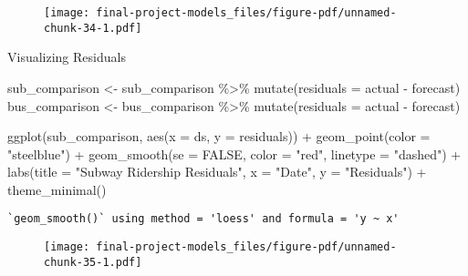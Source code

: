 \documentclass[
  letterpaper,
  DIV=11,
  numbers=noendperiod]{scrartcl}
\newenvironment{Shaded}{\begin{snugshade}}{\end{snugshade}}
\newcommand{\AttributeTok}[1]{\textcolor[rgb]{0.40,0.45,0.13}{#1}}
\newcommand{\ConstantTok}[1]{\textcolor[rgb]{0.56,0.35,0.01}{#1}}
\newcommand{\FunctionTok}[1]{\textcolor[rgb]{0.28,0.35,0.67}{#1}}
\newcommand{\NormalTok}[1]{\textcolor[rgb]{0.00,0.23,0.31}{#1}}
\newcommand{\OtherTok}[1]{\textcolor[rgb]{0.00,0.23,0.31}{#1}}
\newcommand{\SpecialCharTok}[1]{\textcolor[rgb]{0.37,0.37,0.37}{#1}}
\newcommand{\StringTok}[1]{\textcolor[rgb]{0.13,0.47,0.30}{#1}}
\begin{document}
\begin{figure}[H]

{\centering \texttt{[image: final-project-models\_files/figure-pdf/unnamed-chunk-34-1.pdf]}

}

\end{figure}

Visualizing Residuals

\begin{Shaded}
\begin{Highlighting}[]
\NormalTok{sub\_comparison }\OtherTok{\textless{}{-}}\NormalTok{ sub\_comparison }\SpecialCharTok{\%\textgreater{}\%} \FunctionTok{mutate}\NormalTok{(}\AttributeTok{residuals =}\NormalTok{ actual }\SpecialCharTok{{-}}\NormalTok{ forecast)}
\NormalTok{bus\_comparison }\OtherTok{\textless{}{-}}\NormalTok{ bus\_comparison }\SpecialCharTok{\%\textgreater{}\%} \FunctionTok{mutate}\NormalTok{(}\AttributeTok{residuals =}\NormalTok{ actual }\SpecialCharTok{{-}}\NormalTok{ forecast)}

\FunctionTok{ggplot}\NormalTok{(sub\_comparison, }\FunctionTok{aes}\NormalTok{(}\AttributeTok{x =}\NormalTok{ ds, }\AttributeTok{y =}\NormalTok{ residuals)) }\SpecialCharTok{+}
  \FunctionTok{geom\_point}\NormalTok{(}\AttributeTok{color =} \StringTok{"steelblue"}\NormalTok{) }\SpecialCharTok{+}
  \FunctionTok{geom\_smooth}\NormalTok{(}\AttributeTok{se =} \ConstantTok{FALSE}\NormalTok{, }\AttributeTok{color =} \StringTok{"red"}\NormalTok{, }\AttributeTok{linetype =} \StringTok{"dashed"}\NormalTok{) }\SpecialCharTok{+}
  \FunctionTok{labs}\NormalTok{(}\AttributeTok{title =} \StringTok{"Subway Ridership Residuals"}\NormalTok{,}
       \AttributeTok{x =} \StringTok{"Date"}\NormalTok{,}
       \AttributeTok{y =} \StringTok{"Residuals"}\NormalTok{) }\SpecialCharTok{+}
  \FunctionTok{theme\_minimal}\NormalTok{()}
\end{Highlighting}
\end{Shaded}

\begin{verbatim}
`geom_smooth()` using method = 'loess' and formula = 'y ~ x'
\end{verbatim}

\begin{figure}[H]

{\centering \texttt{[image: final-project-models\_files/figure-pdf/unnamed-chunk-35-1.pdf]}

}

\end{figure}
\end{document}

